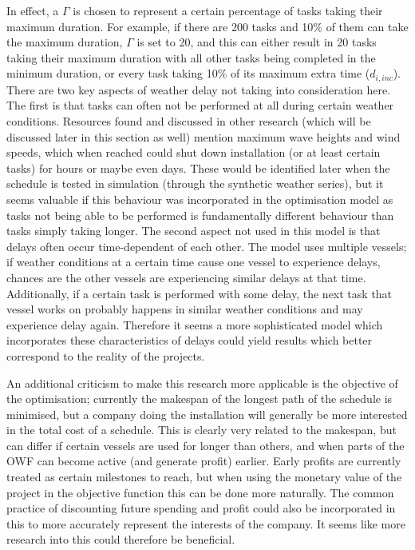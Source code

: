 \documentclass[a4paper,12pt]{article}
\begin{document}
In effect, a $\Gamma$ is chosen to represent a certain percentage of tasks taking their maximum duration. For example, if there are 200 tasks and 10\% of them can take the maximum duration, $\Gamma$ is set to 20, and this can either result in 20 tasks taking their maximum duration with all other tasks being completed in the minimum duration, or every task taking 10\% of its maximum extra time ($d_{i, inc}$). There are two key aspects of weather delay not taking into consideration here. The first is that tasks can often not be performed at all during certain weather conditions. Resources found and discussed in other research (which will be discussed later in this section as well) mention maximum wave heights and wind speeds, which when reached could shut down installation (or at least certain tasks) for hours or maybe even days. These would be identified later when the schedule is tested in simulation (through the synthetic weather series), but it seems valuable if this behaviour was incorporated in the optimisation model as tasks not being able to be performed is fundamentally different behaviour than tasks simply taking longer. The second aspect not used in this model is that delays often occur time-dependent of each other. The model uses multiple vessels; if weather conditions at a certain time cause one vessel to experience delays, chances are the other vessels are experiencing similar delays at that time. Additionally, if a certain task is performed with some delay, the next task that vessel works on probably happens in similar weather conditions and may experience delay again. Therefore it seems a more sophisticated model which incorporates these characteristics of delays could yield results which better correspond to the reality of the projects. 

An additional criticism to make this research more applicable is the objective of the optimisation; currently the makespan of the longest path of the schedule is minimised, but a company doing the installation will generally be more interested in the total cost of a schedule. This is clearly very related to the makespan, but can differ if certain vessels are used for longer than others, and when parts of the OWF can become active (and generate profit) earlier. Early profits are currently treated as certain milestones to reach, but when using the monetary value of the project in the objective function this can be done more naturally. The common practice of discounting future spending and profit could also be incorporated in this to more accurately represent the interests of the company. It seems like more research into this could therefore be beneficial. 
\end{document}
